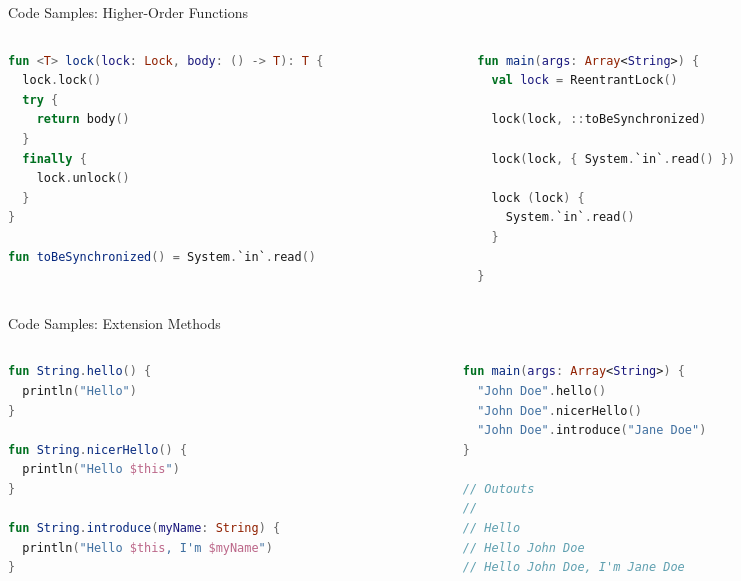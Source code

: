 \begin{frame}[fragile]{Code Samples: Higher-Order Functions}
	\begin{columns}
		\begin{column}{0.5\textwidth}
\begin{lstlisting}[language=Kotlin,basicstyle=\ttfamily\tiny]
fun <T> lock(lock: Lock, body: () -> T): T {
  lock.lock()
  try {
    return body()
  }
  finally {
    lock.unlock()
  }
}

fun toBeSynchronized() = System.`in`.read()
\end{lstlisting}
		\end{column}
		\begin{column}{0.5\textwidth}
\begin{lstlisting}[language=Kotlin,basicstyle=\ttfamily\tiny]
fun main(args: Array<String>) {
  val lock = ReentrantLock()

  lock(lock, ::toBeSynchronized)

  lock(lock, { System.`in`.read() })

  lock (lock) {
    System.`in`.read()
  }

}
\end{lstlisting}
		\end{column}
	\end{columns}
\end{frame}

\begin{frame}[fragile]{Code Samples: Extension Methods}
	\begin{columns}
		\begin{column}{0.5\textwidth}
\begin{lstlisting}[language=Kotlin,basicstyle=\ttfamily\tiny]
fun String.hello() {
  println("Hello")
}

fun String.nicerHello() {
  println("Hello $this")
}

fun String.introduce(myName: String) {
  println("Hello $this, I'm $myName")
}
\end{lstlisting}
		\end{column}
		\begin{column}{0.5\textwidth}
\begin{lstlisting}[language=Kotlin,basicstyle=\ttfamily\tiny]
fun main(args: Array<String>) {
  "John Doe".hello()
  "John Doe".nicerHello()
  "John Doe".introduce("Jane Doe")
}

// Outouts
//
// Hello
// Hello John Doe
// Hello John Doe, I'm Jane Doe
\end{lstlisting}
		\end{column}
	\end{columns}
\end{frame}


